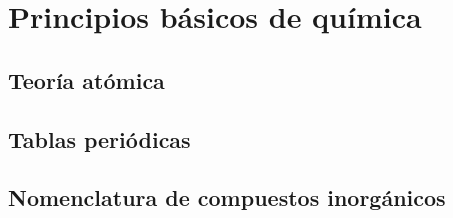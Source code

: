 \documentclass{AsignaturaResumen}
\begin{document}
    \frontmatter

\Portada
\Indices

    \mainmatter


\part{Principios básicos de química}

    \chapter{Teoría atómica}     
%
%

    
    \PlainGeom
    \appendix

\chapter{Tablas periódicas}
\chapter{Nomenclatura de compuestos inorgánicos}

    \backmatter

\Bibliografia
\Glosarios
\end{document}
